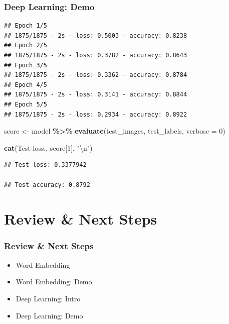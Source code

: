 \documentclass[
  shownotes,
  xcolor={svgnames},
  hyperref={colorlinks,citecolor=DarkBlue,linkcolor=DarkRed,urlcolor=DarkBlue}
  , aspectratio=169]{beamer}
\newenvironment{Shaded}{\begin{snugshade}}{\end{snugshade}}
\newcommand{\CharTok}[1]{\textcolor[rgb]{0.31,0.60,0.02}{#1}}
\newcommand{\DataTypeTok}[1]{\textcolor[rgb]{0.13,0.29,0.53}{#1}}
\newcommand{\DecValTok}[1]{\textcolor[rgb]{0.00,0.00,0.81}{#1}}
\newcommand{\KeywordTok}[1]{\textcolor[rgb]{0.13,0.29,0.53}{\textbf{#1}}}
\newcommand{\NormalTok}[1]{#1}
\newcommand{\OperatorTok}[1]{\textcolor[rgb]{0.81,0.36,0.00}{\textbf{#1}}}
\newcommand{\StringTok}[1]{\textcolor[rgb]{0.31,0.60,0.02}{#1}}
\begin{document}
\begin{frame}[fragile]
\frametitle{Deep Learning: Demo}
\begin{scriptsize}
\begin{verbatim}
## Epoch 1/5
## 1875/1875 - 2s - loss: 0.5003 - accuracy: 0.8238
## Epoch 2/5
## 1875/1875 - 2s - loss: 0.3782 - accuracy: 0.8643
## Epoch 3/5
## 1875/1875 - 2s - loss: 0.3362 - accuracy: 0.8784
## Epoch 4/5
## 1875/1875 - 2s - loss: 0.3141 - accuracy: 0.8844
## Epoch 5/5
## 1875/1875 - 2s - loss: 0.2934 - accuracy: 0.8922
\end{verbatim}
\end{scriptsize}

\begin{Shaded}
\begin{Highlighting}[]
\NormalTok{score \textless{}{-}}\StringTok{ }\NormalTok{model }\OperatorTok{\%\textgreater{}\%}\StringTok{ }\KeywordTok{evaluate}\NormalTok{(test\_images, test\_labels, }\DataTypeTok{verbose =} \DecValTok{0}\NormalTok{)}

\KeywordTok{cat}\NormalTok{(}\StringTok{\textquotesingle{}Test loss:\textquotesingle{}}\NormalTok{, score[}\DecValTok{1}\NormalTok{], }\StringTok{"}\CharTok{\textbackslash{}n}\StringTok{"}\NormalTok{)}
\end{Highlighting}
\end{Shaded}
\begin{scriptsize}

\begin{verbatim}
## Test loss: 0.3377942

## Test accuracy: 0.8792
\end{verbatim}
\end{scriptsize}
\end{frame}

\section{Review
 \& Next Steps}
\begin{frame}
\frametitle{Review \& Next Steps}
  
\begin{itemize} 
  
\item  Word Embedding
\item  Word Embedding: Demo
\item  Deep Learning: Intro
\item  Deep Learning: Demo


\end{itemize}
\end{frame}
\end{document}
